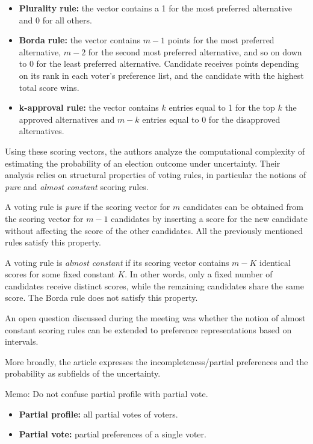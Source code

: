 \documentclass{article}
\begin{document}
\begin{itemize}
    \item \textbf{Plurality rule:} the vector contains a 1 for the most preferred alternative and 0 for all others.
    \item \textbf{Borda rule:} the vector contains $m-1$ points for the most preferred alternative, $m-2$ for the second most preferred alternative, and so on down to 0 for the least preferred alternative. Candidate receives points depending on its rank in each voter's preference list, and the candidate with the highest total score wins.
    \item \textbf{k-approval rule:} the vector contains $k$ entries equal to 1 for the top $k$ the approved alternatives and $m-k$ entries equal to 0 for the disapproved alternatives.
\end{itemize}

Using these scoring vectors, the authors analyze the computational complexity of estimating the probability of an election outcome under uncertainty. Their analysis relies on structural properties of voting rules, in particular the notions of \textit{pure} and \textit{almost constant} scoring rules.

A voting rule is \textit{pure} if the scoring vector for $m$ candidates can be obtained from the scoring vector for $m-1$ candidates by inserting a score for the new candidate without affecting the score of the other candidates. All the previously mentioned rules satisfy this property.

A voting rule is \textit{almost constant} if its scoring vector contains $m-K$ identical scores for some fixed constant $K$. In other words, only a fixed number of candidates receive distinct scores, while the remaining candidates share the same score. The Borda rule does not satisfy this property.

An open question discussed during the meeting was whether the notion of almost constant scoring rules can be extended to preference representations based on intervals.

More broadly, the article expresses the incompleteness/partial preferences and the probability as subfields of the uncertainty.


\begin{tcolorbox}[colback=yellow!5!white, colframe=yellow!50!black]
Memo: Do not confuse partial profile with partial vote.
\begin{itemize}
    \item \textbf{Partial profile:} all partial votes of voters.
    \item \textbf{Partial vote:} partial preferences of a single voter.
\end{itemize}
\end{tcolorbox}
\end{document}
